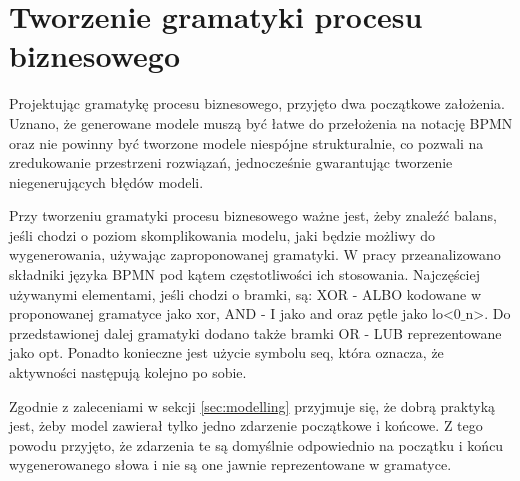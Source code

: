\section{Tworzenie gramatyki procesu biznesowego}
\label{sec:businessGrammarCreation}
Projektując gramatykę procesu biznesowego, przyjęto dwa początkowe założenia. Uznano, że generowane modele muszą być łatwe do przełożenia na notację BPMN oraz nie powinny być tworzone modele niespójne strukturalnie, co pozwali na zredukowanie przestrzeni rozwiązań, jednocześnie gwarantując tworzenie niegenerujących błędów modeli.

Przy tworzeniu gramatyki procesu biznesowego ważne jest, żeby znaleźć balans, jeśli chodzi o poziom skomplikowania modelu, jaki będzie możliwy do wygenerowania, używając zaproponowanej gramatyki.  W pracy \cite{10.1007/978-3-540-69534-9_35} przeanalizowano składniki języka BPMN pod kątem częstotliwości ich stosowania. Najczęściej używanymi elementami, jeśli chodzi o bramki, są: XOR - ALBO kodowane w proponowanej gramatyce jako xor, AND - I jako and oraz pętle jako lo<0$\_$n>. Do przedstawionej dalej gramatyki dodano także bramki OR - LUB reprezentowane jako opt. Ponadto konieczne jest użycie symbolu seq, która oznacza, że aktywności następują kolejno po sobie.

Zgodnie z zaleceniami w sekcji \ref{sec:modelling} przyjmuje się, że dobrą praktyką jest, żeby model zawierał tylko jedno zdarzenie początkowe i końcowe. Z tego powodu przyjęto, że zdarzenia te są domyślnie odpowiednio na początku i końcu wygenerowanego słowa i nie są one jawnie reprezentowane w gramatyce.

